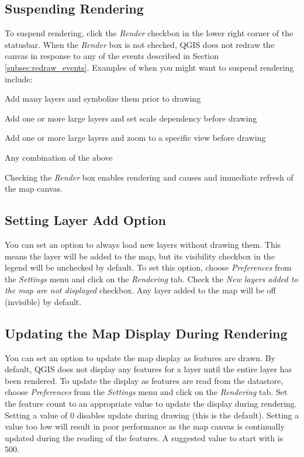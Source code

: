 \subsection{Suspending Rendering}
To suspend rendering, click the \textit{Render} checkbox in the lower right
corner of the statusbar. When the \textit{Render} box is not checked, QGIS does
not redraw the canvas in response to any of the events described in Section
\ref{subsec:redraw_events}. Examples of when you might want to suspend rendering
include:
\begin{compactitem}
\item Add many layers and symbolize them prior to drawing
\item Add one or more large layers and set scale dependency before drawing
\item Add one or more large layers and zoom to a specific view before drawing
\item Any combination of the above
\end{compactitem}
Checking the \textit{Render} box enables rendering and causes and immediate
refresh of the map canvas.
\subsection{Setting Layer Add
Option}
You can set an option to always load new layers without drawing them. This means
the layer will be added to the map, but its visibility checkbox in the legend
will be unchecked by default. To set this option, choose \textit{Preferences} from the
\textit{Settings} menu and click on the \textit{Rendering} tab. Check the
\textit{New layers added to the map are not displayed} checkbox. Any layer added
to the map will be off (invisible) by default.
\subsection{Updating the Map Display During Rendering}
You can set an option to update the map display as features are drawn. By
default, QGIS does not display any features for a layer until the entire layer
has been rendered. To update the display as features are read from the
datastore, choose \textit{Preferences} from the \textit{Settings} menu and
click on the \textit{Rendering} tab. Set the feature count to an appropriate
value to update the display during rendering. Setting a value of 0 disables
update during drawing (this is the default). Setting a value too low will
result in poor performance as the map canvas is continually updated during the
reading of the features. A suggested value to start with is 500. 

